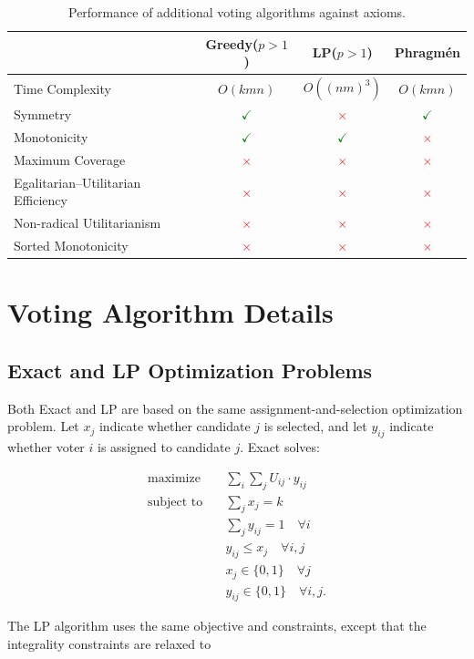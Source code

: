 \documentclass[11pt]{article}
\newcommand{\Pass}{\textcolor{green}{$\checkmark$}}
\newcommand{\Fail}{\textcolor{red}{$\times$}}
\begin{document}
\begin{table}[ht]
\centering
\begin{tabular}{lccc}
\hline
 & Greedy($p>1$) & LP($p>1$) & Phragm\'en \\
\hline
Time Complexity & $O(kmn)$ & $O((nm)^3)$ & $O(kmn)$ \\
Symmetry & \Pass & \Fail & \Pass \\
Monotonicity & \Pass & \Pass & \Fail \\
Maximum Coverage & \Fail & \Fail & \Fail \\
Egalitarian–Utilitarian Efficiency & \Fail & \Fail & \Fail \\
Non-radical Utilitarianism & \Fail & \Fail & \Fail \\
Sorted Monotonicity & \Fail & \Fail & \Fail \\
\hline
\end{tabular}
\caption{Performance of additional voting algorithms against axioms.}
\label{tab:additional-voting}
\end{table}

\section{Voting Algorithm Details}

\subsection{Exact and LP Optimization Problems}
\label{app:exact-lp-formulations}

Both Exact and LP are based on the same assignment-and-selection optimization problem. Let $x_j$ indicate whether candidate $j$ is selected, and let $y_{ij}$ indicate whether voter $i$ is assigned to candidate $j$. Exact solves:

\[
\begin{aligned}
\text{maximize} \quad & \sum_i \sum_j U_{ij} \cdot y_{ij} \\
\text{subject to} \quad
& \sum_j x_j = k \\
& \sum_j y_{ij} = 1 \quad \forall i \\
& y_{ij} \le x_j \quad \forall i,j \\
& x_j \in \{0,1\} \quad \forall j \\
& y_{ij} \in \{0,1\} \quad \forall i,j.
\end{aligned}
\]

The LP algorithm uses the same objective and constraints, except that the integrality constraints are relaxed to
\end{document}
